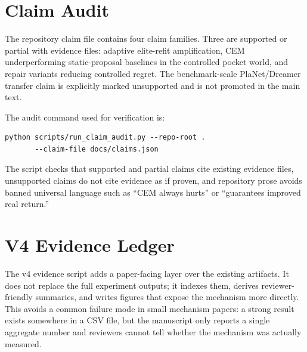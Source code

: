 \section{Claim Audit}
\label{app:claim-audit}

The repository claim file contains four claim families. Three are supported or partial with evidence files: adaptive elite-refit amplification, CEM underperforming static-proposal baselines in the controlled pocket world, and repair variants reducing controlled regret. The benchmark-scale PlaNet/Dreamer transfer claim is explicitly marked unsupported and is not promoted in the main text.

The audit command used for verification is:
\begin{verbatim}
python scripts/run_claim_audit.py --repo-root .
       --claim-file docs/claims.json
\end{verbatim}
The script checks that supported and partial claims cite existing evidence files, unsupported claims do not cite evidence as if proven, and repository prose avoids banned universal language such as ``CEM always hurts'' or ``guarantees improved real return.''

\section{V4 Evidence Ledger}
\label{app:v4-ledger}

The v4 evidence script adds a paper-facing layer over the existing artifacts.
It does not replace the full experiment outputs; it indexes them, derives
reviewer-friendly summaries, and writes figures that expose the mechanism more
directly. This avoids a common failure mode in small mechanism papers: a
strong result exists somewhere in a CSV file, but the manuscript only reports a
single aggregate number and reviewers cannot tell whether the mechanism was
actually measured.

